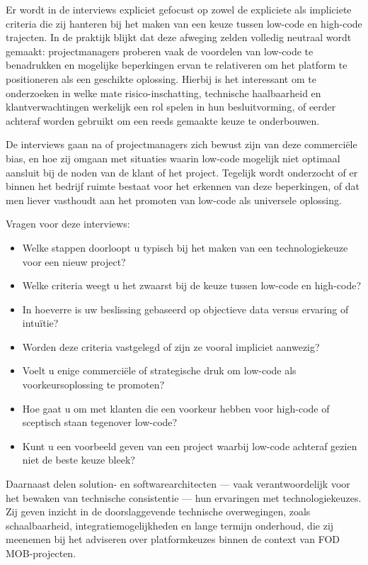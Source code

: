 Er wordt in de interviews expliciet gefocust op zowel de expliciete als impliciete criteria die zij hanteren bij het maken van een keuze tussen low-code en high-code trajecten. In de praktijk blijkt dat deze afweging zelden volledig neutraal wordt gemaakt: projectmanagers proberen vaak de voordelen van low-code te benadrukken en mogelijke beperkingen ervan te relativeren om het platform te positioneren als een geschikte oplossing. Hierbij is het interessant om te onderzoeken in welke mate risico-inschatting, technische haalbaarheid en klantverwachtingen werkelijk een rol spelen in hun besluitvorming, of eerder achteraf worden gebruikt om een reeds gemaakte keuze te onderbouwen.

De interviews gaan na of projectmanagers zich bewust zijn van deze commerciële bias, en hoe zij omgaan met situaties waarin low-code mogelijk niet optimaal aansluit bij de noden van de klant of het project. Tegelijk wordt onderzocht of er binnen het bedrijf ruimte bestaat voor het erkennen van deze beperkingen, of dat men liever vasthoudt aan het promoten van low-code als universele oplossing.

Vragen voor deze interviews: 
\begin{itemize} 
    \item Welke stappen doorloopt u typisch bij het maken van een technologiekeuze voor een nieuw project? 
    \item Welke criteria weegt u het zwaarst bij de keuze tussen low-code en high-code? 
    \item In hoeverre is uw beslissing gebaseerd op objectieve data versus ervaring of intuïtie? 
    \item Worden deze criteria vastgelegd of zijn ze vooral impliciet aanwezig? \item Voelt u enige commerciële of strategische druk om low-code als voorkeursoplossing te promoten? 
    \item Hoe gaat u om met klanten die een voorkeur hebben voor high-code of sceptisch staan tegenover low-code? 
    \item Kunt u een voorbeeld geven van een project waarbij low-code achteraf gezien niet de beste keuze bleek? 
\end{itemize}



Daarnaast delen solution- en softwarearchitecten — vaak verantwoordelijk voor het bewaken van technische consistentie — hun ervaringen met technologiekeuzes. Zij geven inzicht in de doorslaggevende technische overwegingen, zoals schaalbaarheid, integratiemogelijkheden en lange termijn onderhoud, die zij meenemen bij het adviseren over platformkeuzes binnen de context van \gls{FOD MOB}-projecten.

